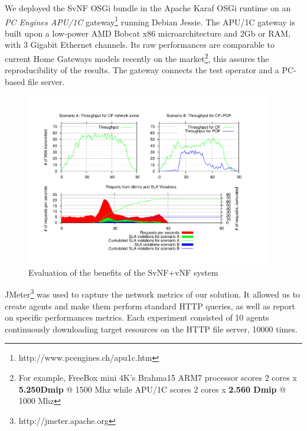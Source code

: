 We deployed the SvNF OSGi bundle in the Apache Karaf OSGi runtime on an \textit{PC Engines APU/1C} gateway\footnote{http://www.pcengines.ch/apu1c.htm} running Debian Jessie. 
The APU/1C gateway is built upon a low-power AMD Bobcat x86 microarchitecture and 2Gb or RAM, with 3 Gigabit Ethernet channels. Its raw performances are comparable to current Home Gateways models recently on the market\footnote{For example, FreeBox mini 4K's Brahma15 ARM7 processor scores 2 cores x \textbf{5.250Dmip} @ 1500 Mhz while APU/1C scores 2 cores x \textbf{2.560 Dmip} @ 1000 Mhz}, this assures the reproducibility of the results. The gateway connects the test operator and a PC-based file server.



\begin{figure}
  \begin{center}
    \includegraphics[width=0.95\textwidth]{fig/CP+POP_evaluation.pdf}
  \end{center}
  \caption{ Evaluation of the benefits of the SvNF+vNF system
    \label{fig:cppopeval}
  }
\end{figure}	







JMeter\footnote{http://jmeter.apache.org} was used to capture the network metrics of our solution.
It allowed us to create agents and make them perform standard HTTP queries, as well as report on specific performances metrics. Each experiment consisted of 10 agents continuously downloading target resources on the HTTP file server, 10000 times.

